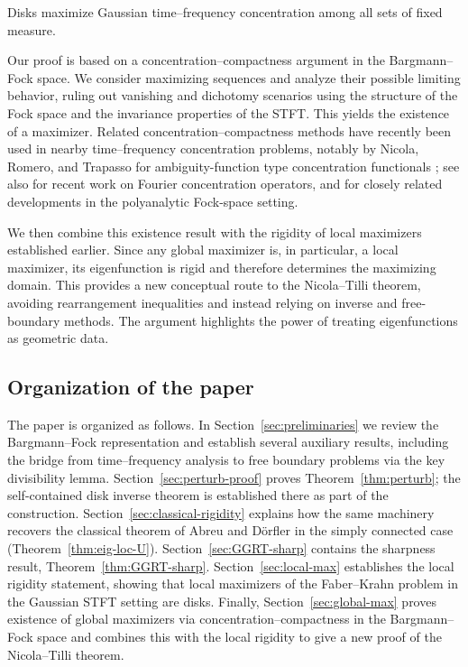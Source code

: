 \begin{theorem}
Disks maximize Gaussian time--frequency concentration among all sets of fixed measure.
\end{theorem}

Our proof is based on a concentration--compactness argument in the Bargmann--Fock space. We consider maximizing sequences and analyze their possible limiting behavior, ruling out vanishing and dichotomy scenarios using the structure of the Fock space and the invariance properties of the STFT. This yields the existence of a maximizer. Related concentration--compactness methods have recently been used in nearby time--frequency concentration problems, notably by Nicola, Romero, and Trapasso for ambiguity-function type concentration functionals \cite{Nicola-Romero-Trapasso}; see also \cite{Marceca-Romero-Speckbacher,Samuelsen} for recent work on Fourier concentration operators, and \cite{Fulsche-Hagger} for closely related developments in the polyanalytic Fock-space setting.

We then combine this existence result with the rigidity of local maximizers established earlier. Since any global maximizer is, in particular, a local maximizer, its eigenfunction is rigid and therefore determines the maximizing domain. This provides a new conceptual route to the Nicola--Tilli theorem, avoiding rearrangement inequalities and instead relying on inverse and free-boundary methods. The argument highlights the power of treating eigenfunctions as geometric data.

\subsection{Organization of the paper}

The paper is organized as follows. In Section~\ref{sec:preliminaries} we review the Bargmann--Fock representation and establish several auxiliary results, including the bridge from time--frequency analysis to free boundary problems via the key divisibility lemma. Section~\ref{sec:perturb-proof} proves Theorem~\ref{thm:perturb}; the self-contained disk inverse theorem is established there as part of the construction. Section~\ref{sec:classical-rigidity} explains how the same machinery recovers the classical theorem of Abreu and D\"orfler in the simply connected case (Theorem~\ref{thm:eig-loc-U}). Section~\ref{sec:GGRT-sharp} contains the sharpness result, Theorem~\ref{thm:GGRT-sharp}. Section~\ref{sec:local-max} establishes the local rigidity statement, showing that local maximizers of the Faber--Krahn problem in the Gaussian STFT setting are disks. Finally, Section~\ref{sec:global-max} proves existence of global maximizers via concentration--compactness in the Bargmann--Fock space and combines this with the local rigidity to give a new proof of the Nicola--Tilli theorem.

